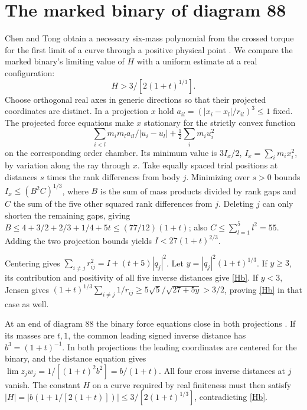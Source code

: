 \documentclass[11pt]{article}
\begin{document}
\section{The marked binary of diagram 88}
Chen and Tong obtain a necessary six-mass polynomial from the crossed torque for the first limit of a curve through a positive physical point \cite[Prop.~5.14]{CT}. We compare the marked binary's limiting value of $H$ with a uniform estimate at a real configuration:
\begin{equation}\label{Hb}
 H>3/[2(1+t)^{1/3}] .
\end{equation}
Choose orthogonal real axes in generic directions so that their projected coordinates are distinct. In a projection $x$ hold $a_{il}=(|x_i-x_l|/r_{il})^3\le1$ fixed. The projected force equations make $x$ stationary for the strictly convex function
\[
 \sum_{i<l}m_im_la_{il}/|u_i-u_l|+\tfrac12\sum_i m_i u_i^2
\]
on the corresponding order chamber. Its minimum value is $3 I_x/2$, $I_x=\sum_i m_i x_i^2$, by variation along the ray through $x$. Take equally spaced trial positions at distances $s$ times the rank differences from body $j$. Minimizing over $s>0$ bounds $I_x\le (B^2 C)^{1/3}$, where $B$ is the sum of mass products divided by rank gaps and $C$ the sum of the five other squared rank differences from $j$. Deleting $j$ can only shorten the remaining gaps, giving $B\le 4+3/2+2/3+1/4+5t\le(77/12)(1+t)$; also $C\le\sum_{l=1}^5l^2=55$. Adding the two projection bounds yields $I<27(1+t)^{2/3}$.

Centering gives $\sum_{i\ne j}r_{ij}^2=I+(t+5)|q_j|^2$. Let $y=|q_j|^2(1+t)^{1/3}$. If $y\ge3$, its contribution and positivity of all five inverse distances give \eqref{Hb}. If $y<3$, Jensen gives $(1+t)^{1/3}\sum_{i\ne j}1/r_{ij}\ge 5\sqrt5/\sqrt{27+5y}>3/2$, proving \eqref{Hb} in that case as well.

At an end of diagram 88 the binary force equations close in both projections \cite[Lemma 6.16(a) and its proof]{Tomar}. If its masses are $t,1$, the common leading signed inverse distance has $b^3=(1+t)^{-1}$. In both projections the leading coordinates are centered for the binary, and the distance equation gives $\lim z_jw_j=1/[(1+t)^2b^2]=b/(1+t)$. All four cross inverse distances at $j$ vanish. The constant $H$ on a curve required by real finiteness must then satisfy $|H|=|b(1+1/[2(1+t)])|\le 3/[2(1+t)^{1/3}]$, contradicting \eqref{Hb}.
\end{document}
